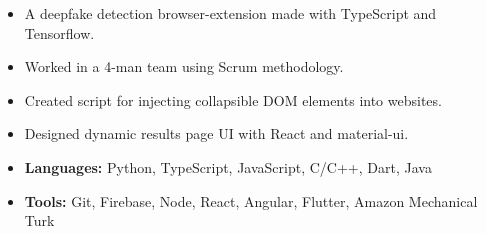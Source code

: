 
\begin{itemize}
\item A deepfake detection browser-extension made with TypeScript and Tensorflow.
\item Worked in a 4-man team using Scrum methodology.
\item Created script for injecting collapsible DOM elements into websites.
\item Designed dynamic results page UI with React and material-ui.
\end{itemize}





\begin{itemize}
    \item \textbf{Languages:} Python, TypeScript, JavaScript, C/C++, Dart, Java
    \item \textbf{Tools:} Git, Firebase, Node, React, Angular, Flutter, Amazon Mechanical Turk
\end{itemize}